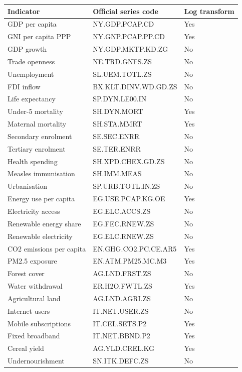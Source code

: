 \begin{tabular}{lll}
\hline
Indicator & Official series code & Log transform \\
\hline
GDP per capita & NY.GDP.PCAP.CD & Yes \\
GNI per capita PPP & NY.GNP.PCAP.PP.CD & Yes \\
GDP growth & NY.GDP.MKTP.KD.ZG & No \\
Trade openness & NE.TRD.GNFS.ZS & No \\
Unemployment & SL.UEM.TOTL.ZS & No \\
FDI inflow & BX.KLT.DINV.WD.GD.ZS & No \\
Life expectancy & SP.DYN.LE00.IN & No \\
Under-5 mortality & SH.DYN.MORT & Yes \\
Maternal mortality & SH.STA.MMRT & Yes \\
Secondary enrolment & SE.SEC.ENRR & No \\
Tertiary enrolment & SE.TER.ENRR & No \\
Health spending & SH.XPD.CHEX.GD.ZS & No \\
Measles immunisation & SH.IMM.MEAS & No \\
Urbanisation & SP.URB.TOTL.IN.ZS & No \\
Energy use per capita & EG.USE.PCAP.KG.OE & Yes \\
Electricity access & EG.ELC.ACCS.ZS & No \\
Renewable energy share & EG.FEC.RNEW.ZS & No \\
Renewable electricity & EG.ELC.RNEW.ZS & No \\
CO2 emissions per capita & EN.GHG.CO2.PC.CE.AR5 & Yes \\
PM2.5 exposure & EN.ATM.PM25.MC.M3 & Yes \\
Forest cover & AG.LND.FRST.ZS & No \\
Water withdrawal & ER.H2O.FWTL.ZS & Yes \\
Agricultural land & AG.LND.AGRI.ZS & No \\
Internet users & IT.NET.USER.ZS & No \\
Mobile subscriptions & IT.CEL.SETS.P2 & Yes \\
Fixed broadband & IT.NET.BBND.P2 & Yes \\
Cereal yield & AG.YLD.CREL.KG & Yes \\
Undernourishment & SN.ITK.DEFC.ZS & No \\
\hline
\end{tabular}
